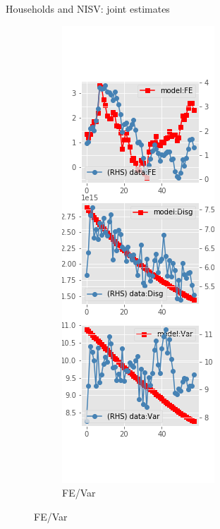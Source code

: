 \documentclass{beamer}
\begin{document}
\begin{frame}{Households and NISV: joint estimates}
	\begin{figure}[ht]
		\label{NISV_diag_joint_SCE}
		\begin{subfigure}[b]{0.2\textwidth}
			\centering
			\caption{FE/Var}
			\includegraphics[width=\textwidth, height = 0.8\textheight]{figuresDraft/sce_ni_est_sv_joint_diag0.png}

\end{subfigure}
\end{figure}
\end{frame}
\end{document}
